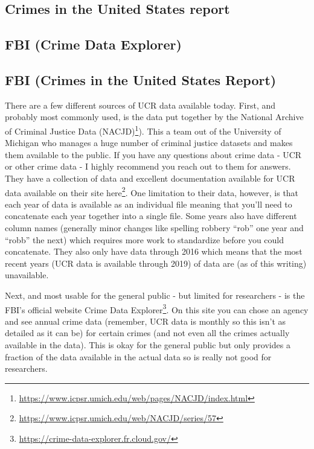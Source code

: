 \documentclass[
]{krantz}
\renewcommand{\href}[2]{#2\footnote{\url{#1}}}
\begin{document}
\subsection{Crimes in the United States
report}\label{crimes-in-the-united-states-report}

\subsection{FBI (Crime Data
Explorer)}\label{fbi-crime-data-explorer}

\subsection{FBI (Crimes in the United States
Report)}\label{fbi-crimes-in-the-united-states-report}

There are a few different sources of UCR data available
today. First, and probably most commonly used, is the data
put together by the
\href{https://www.icpsr.umich.edu/web/pages/NACJD/index.html}{National
Archive of Criminal Justice Data (NACJD)}). This a team out
of the University of Michigan who manages a huge number of
criminal justice datasets and makes them available to the
public. If you have any questions about crime data - UCR or
other crime data - I highly recommend you reach out to them
for answers. They have a collection of data and excellent
documentation available for UCR data available on their site
\href{https://www.icpsr.umich.edu/web/NACJD/series/57}{here}.
One limitation to their data, however, is that each year of
data is available as an individual file meaning that you'll
need to concatenate each year together into a single file.
Some years also have different column names (generally minor
changes like spelling robbery ``rob'' one year and ``robb''
the next) which requires more work to standardize before you
could concatenate. They also only have data through 2016
which means that the most recent years (UCR data is
available through 2019) of data are (as of this writing)
unavailable.

Next, and most usable for the general public - but limited
for researchers - is the FBI's official website
\href{https://crime-data-explorer.fr.cloud.gov/}{Crime Data
Explorer}. On this site you can chose an agency and see
annual crime data (remember, UCR data is monthly so this
isn't as detailed as it can be) for certain crimes (and not
even all the crimes actually available in the data). This is
okay for the general public but only provides a fraction of
the data available in the actual data so is really not good
for researchers.
\end{document}

